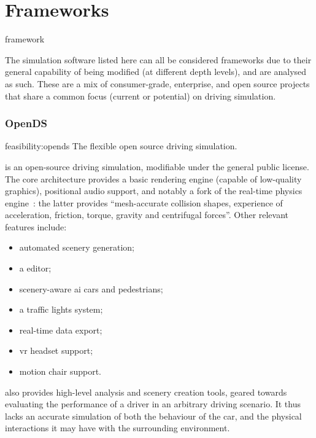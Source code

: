 \section{Frameworks}\label{sc:stateoftheart:frameworks}

\begin{definition}{framework}
\end{definition}

The simulation software listed here can all be considered \glspl{framework} due to their general capability of being modified (at different depth levels), and are analysed as such. These are a mix of consumer-grade, enterprise, and open source projects that share a common focus (current or potential) on driving simulation.

\subsubsection{OpenDS}

\begin{excerpt}{feasibility:opends}
    The flexible open source driving simulation.
\end{excerpt}

 is an open-source driving simulation, modifiable under the  general public license. The core architecture provides a basic rendering engine (capable of low-quality graphics), positional audio support, and notably a  fork of the  real-time physics engine~\cite{feasibility:bullet}: the latter provides \enquote{mesh-accurate collision shapes, experience of acceleration, friction, torque, gravity and centrifugal forces}{\cite{feasibility:opendsfeatures}}. Other relevant features include:

\begin{itemize}
    \item automated scenery generation;
    \item a  editor;
	\item scenery-aware \gls{ai} cars and pedestrians;
    \item a traffic lights system;
    \item real-time data export;
    \item {} \gls{vr} headset support;
    \item motion chair support.
\end{itemize}

 also provides high-level analysis and scenery creation tools, geared towards evaluating the performance of a driver in an arbitrary driving scenario. It thus lacks an accurate simulation of both the behaviour of the car, and the physical interactions it may have with the surrounding environment.

